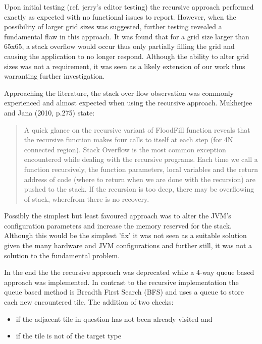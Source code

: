 Upon initial testing (ref. jerry's editor testing) the recursive approach performed exactly as expected with no functional issues  to report.  However, when the possibility of larger grid sizes was suggested, further testing revealed a fundamental flaw in this approach.  It was found that for a grid size larger than 65x65, a stack overflow would occur thus only partially filling the grid and causing the application to no longer respond.  Although the ability to alter grid sizes was not a requirement, it was seen as a likely extension of our work thus warranting further investigation.  

Approaching the literature, the stack over flow observation was commonly experienced and almost expected when using the recursive approach.  Mukherjee and Jana (2010, p.275) state:

 \begin{quotation}
A quick glance on the recursive variant of FloodFill function reveals that the recursive function makes four calls to itself at each step (for 4N connected region). Stack Overflow is the most common exception encountered while dealing with the recursive programs. Each time we call a function recursively, the function parameters, local variables and the return address of code (where to return when we are done with the recursion) are pushed to the stack. If the recursion is too deep, there may be overflowing of stack, wherefrom there is no recovery.
 \end{quotation}
 
Possibly the simplest but least favoured approach was to alter the JVM's configuration parameters and increase the memory reserved for the stack.  Although this would be the simplest 'fix' it was not seen as a suitable solution given the many hardware and JVM configurations and further still, it was not a solution to the fundamental problem.

In the end the the recursive approach was deprecated while a 4-way queue based approach was implemented.  In contrast to the recursive implementation the queue based method is Breadth First Search (BFS) and uses a queue to store each new encountered tile.  The addition of two checks:

\begin{itemize}
  \item if the adjacent tile in question has not been already visited and
  \item if the tile is not of the target type
\end{itemize}

